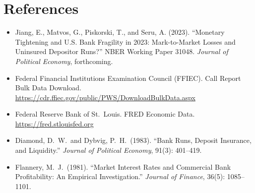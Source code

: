 \documentclass[12pt, a4paper]{article}
\begin{document}
\section*{References}

\begin{itemize}[leftmargin=*, label={}]
    \item Jiang, E., Matvos, G., Piskorski, T., and Seru, A. (2023).
    ``Monetary Tightening and U.S. Bank Fragility in 2023: Mark-to-Market Losses
    and Uninsured Depositor Runs?'' NBER Working Paper 31048.
    \textit{Journal of Political Economy}, forthcoming.

    \item Federal Financial Institutions Examination Council (FFIEC).
    Call Report Bulk Data Download.
    \url{https://cdr.ffiec.gov/public/PWS/DownloadBulkData.aspx}

    \item Federal Reserve Bank of St.\ Louis. FRED Economic Data.
    \url{https://fred.stlouisfed.org}

    \item Diamond, D.\ W.\ and Dybvig, P.\ H.\ (1983).
    ``Bank Runs, Deposit Insurance, and Liquidity.''
    \textit{Journal of Political Economy}, 91(3): 401--419.

    \item Flannery, M.\ J.\ (1981).
    ``Market Interest Rates and Commercial Bank Profitability: An Empirical
    Investigation.''
    \textit{Journal of Finance}, 36(5): 1085--1101.

\end{itemize}
\end{document}
